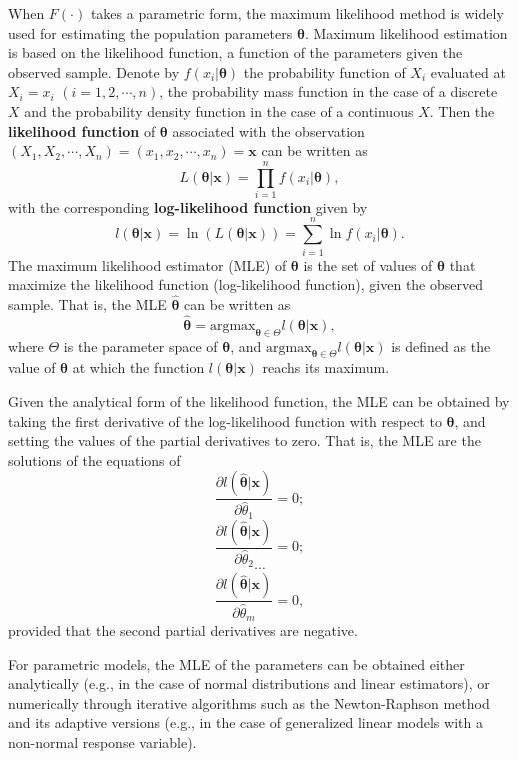 \documentclass[]{book}
\theoremstyle{definition}
\theoremstyle{definition}
\theoremstyle{definition}
\theoremstyle{remark}
\begin{document}
When \(F(\cdot)\) takes a parametric form, the maximum likelihood method
is widely used for estimating the population parameters
\(\boldsymbol{\theta}\). Maximum likelihood estimation is based on the
likelihood function, a function of the parameters given the observed
sample. Denote by \(f(x_i|\boldsymbol{\theta})\) the probability
function of \(X_i\) evaluated at \(X_i=x_i\) \((i=1,2,\cdots,n)\), the
probability mass function in the case of a discrete \(X\) and the
probability density function in the case of a continuous \(X\). Then the
\textbf{likelihood function} of \(\boldsymbol{\theta}\) associated with
the observation \((X_1,X_2,\cdots,X_n)=(x_1,x_2,\cdots,x_n)=\mathbf{x}\)
can be written as
\[L(\boldsymbol{\theta}|\mathbf{x})=\prod_{i=1}^nf(x_i|\boldsymbol{\theta}),\]
with the corresponding \textbf{log-likelihood function} given by
\[l(\boldsymbol{\theta}|\mathbf{x})=\ln(L(\boldsymbol{\theta}|\mathbf{x}))=\sum_{i=1}^n\ln f(x_i|\boldsymbol{\theta}).\]
The maximum likelihood estimator (MLE) of \(\boldsymbol{\theta}\) is the
set of values of \(\boldsymbol{\theta}\) that maximize the likelihood
function (log-likelihood function), given the observed sample. That is,
the MLE \(\hat{\boldsymbol{\theta}}\) can be written as
\[\hat{\boldsymbol{\theta}}={\mbox{argmax}}_{\boldsymbol{\theta}\in\Theta}l(\boldsymbol{\theta}|\mathbf{x}),\]
where \(\Theta\) is the parameter space of \(\boldsymbol{\theta}\), and
\({\mbox{argmax}}_{\boldsymbol{\theta}\in\Theta}l(\boldsymbol{\theta}|\mathbf{x})\)
is defined as the value of \(\boldsymbol{\theta}\) at which the function
\(l(\boldsymbol{\theta}|\mathbf{x})\) reachs its maximum.

Given the analytical form of the likelihood function, the MLE can be
obtained by taking the first derivative of the log-likelihood function
with respect to \(\boldsymbol{\theta}\), and setting the values of the
partial derivatives to zero. That is, the MLE are the solutions of the
equations of
\[\frac{\partial l(\hat{\boldsymbol{\theta}}|\mathbf{x})}{\partial\hat{\theta}_1}=0;\]
\[\frac{\partial l(\hat{\boldsymbol{\theta}}|\mathbf{x})}{\partial\hat{\theta}_2}=0;\]
\[\cdots\]
\[\frac{\partial l(\hat{\boldsymbol{\theta}}|\mathbf{x})}{\partial\hat{\theta}_m}=0,\]
provided that the second partial derivatives are negative.

For parametric models, the MLE of the parameters can be obtained either
analytically (e.g., in the case of normal distributions and linear
estimators), or numerically through iterative algorithms such as the
Newton-Raphson method and its adaptive versions (e.g., in the case of
generalized linear models with a non-normal response variable).
\end{document}
